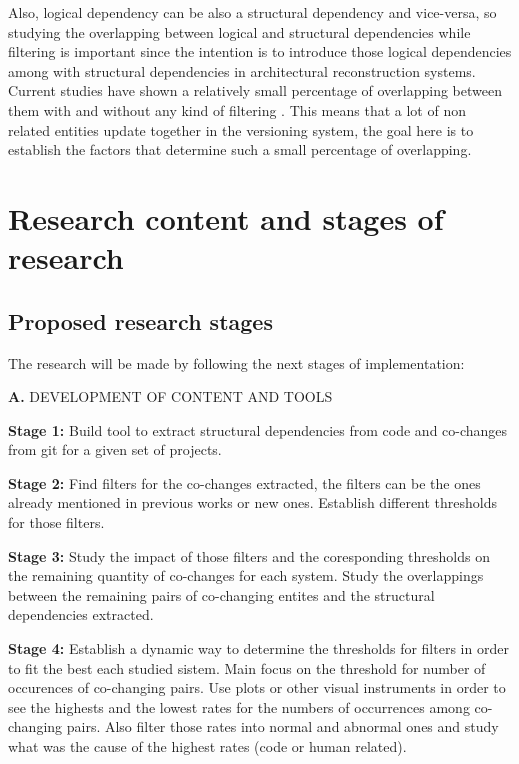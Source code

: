 \documentclass[12pt]{mitthesis}
\begin{document}
Also, logical dependency can be also a structural dependency and vice-versa, so studying the overlapping between logical and structural dependencies while filtering is important since the intention is to introduce those logical dependencies among with structural dependencies in architectural reconstruction systems. Current studies have shown a relatively small percentage of overlapping between them with and without any kind of filtering \cite{DBLP:journals/jss/AjienkaC17}. This means that a lot of non related entities update together in the versioning system, the goal here is to establish the factors that determine such a small percentage of overlapping.



\chapter{Research content and stages of research}

\section{Proposed research stages}
The research will be made by following the next stages of implementation:


\textbf{A.} DEVELOPMENT OF CONTENT AND TOOLS

\textbf{Stage 1:} Build tool to extract structural dependencies from code and co-changes from git for a given set of projects.

\textbf{Stage 2:} Find filters for the co-changes extracted, the filters can be the ones already mentioned in previous works or new ones. Establish different thresholds for those filters.

\textbf{Stage 3:} Study the impact of those filters and the coresponding thresholds on the remaining quantity of co-changes for each system.
Study the overlappings between the remaining pairs of co-changing entites and the structural dependencies extracted. \cite{enase19}

\textbf{Stage 4:} Establish a dynamic way to determine the thresholds for filters in order to fit the best each studied sistem. Main focus on the threshold for number of occurences of co-changing pairs.
Use plots or other visual instruments in order to see the highests and the lowest rates for the numbers of occurrences among co-changing pairs.
Also filter those rates into normal and abnormal ones and study what was the cause of the highest rates (code or human related).
\end{document}
